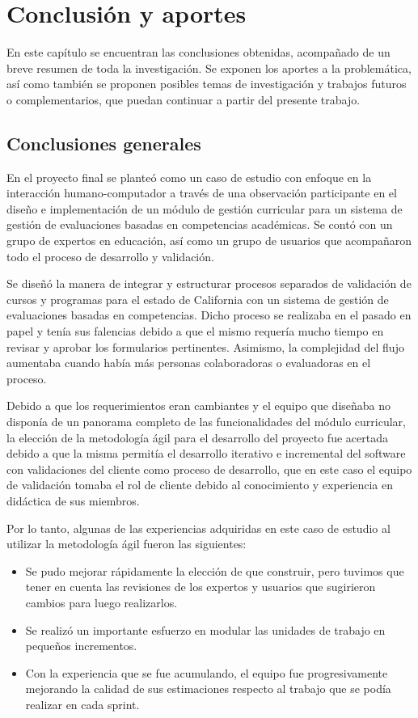 
\chapter{Conclusión y aportes} \label{capitulo7} 
En este capítulo se encuentran las conclusiones obtenidas, acompañado de un breve resumen de toda la investigación. Se exponen los aportes a la problemática, así como también se proponen posibles temas de investigación y trabajos futuros o complementarios, que puedan continuar a partir del presente trabajo.

\section{Conclusiones generales}
En el proyecto final se planteó como un caso de estudio con enfoque en la interacción humano-computador a través de una observación participante en el diseño e implementación de un módulo de gestión curricular para un sistema de gestión de evaluaciones basadas en competencias académicas. Se contó con un grupo de expertos en educación, así como un grupo de usuarios que acompañaron todo el proceso de desarrollo y validación.

Se diseñó la manera de integrar y estructurar procesos separados de validación de cursos y programas para el estado de California con un sistema de gestión de evaluaciones basadas en competencias. Dicho proceso se realizaba en el pasado en papel y tenía sus falencias debido a que el mismo requería mucho tiempo en revisar y aprobar los formularios pertinentes. Asimismo, la complejidad del flujo aumentaba cuando había más personas colaboradoras o evaluadoras en el proceso.

Debido a que los requerimientos eran cambiantes y el equipo que diseñaba no disponía de un panorama completo de las funcionalidades del módulo curricular, la elección de la metodología ágil para el desarrollo del proyecto fue acertada debido a que la misma permitía el desarrollo iterativo e incremental del software con validaciones del cliente como proceso de desarrollo, que en este caso el equipo de validación tomaba el rol de cliente debido al conocimiento y experiencia en didáctica de sus miembros.

Por lo tanto, algunas de las experiencias adquiridas en este caso de estudio al utilizar la metodología ágil fueron las siguientes:
\begin{itemize}
	\item Se pudo mejorar rápidamente la elección de que construir, pero tuvimos que tener en cuenta las revisiones de los expertos y usuarios que sugirieron cambios para luego realizarlos.
	\item Se realizó un importante esfuerzo en modular las unidades de trabajo en pequeños incrementos.
	\item Con la experiencia que se fue acumulando, el equipo fue progresivamente mejorando la calidad de sus estimaciones respecto al trabajo que se podía realizar en cada sprint.
\end{itemize}

